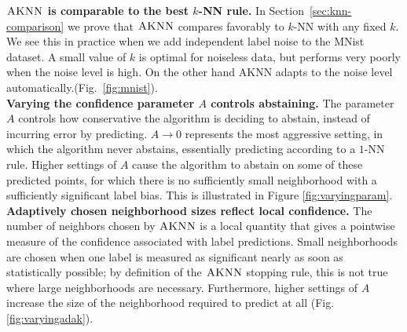 \documentclass{article}
\newcommand{\algname}{\textsc{AKNN}}
\begin{document}
{\bf $\algname$ is comparable to the best $k$-NN rule.}
In Section~\ref{sec:knn-comparison} we prove that $\algname$ compares
favorably to $k$-NN with any fixed $k$. We see this in practice when
we add independent label noise to the MNist dataset. A small value of
$k$ is optimal for noiseless data, but performs very poorly when the
noise level is high. On the other hand AKNN adapts to the noise level
automatically.(Fig.~\ref{fig:mnist}).\\
{\bf Varying the confidence parameter $A$ controls abstaining.}
The parameter $A$ controls how conservative the algorithm is deciding
to abstain, instead of incurring error by predicting. $A \to 0$
represents the most aggressive setting, in which the algorithm never
abstains, essentially predicting according to a $1$-NN rule. Higher
settings of $A$ cause the algorithm to abstain on some of these
predicted points, for which there is no sufficiently small
neighborhood with a sufficiently significant label bias. This is
illustrated in Figure \ref{fig:varyingparam}.\\
{\bf Adaptively chosen neighborhood sizes reflect local confidence.}
The number of neighbors chosen by $\algname$ is a local quantity that
gives a pointwise measure of the confidence associated with label
predictions. Small neighborhoods are chosen when one label is measured
as significant nearly as soon as statistically possible; by definition
of the $\algname$ stopping rule, this is not true where large
neighborhoods are necessary. Furthermore, higher settings of $A$
increase the size of the neighborhood required to predict at all
(Fig. \ref{fig:varyingadak}).


\end{document}
